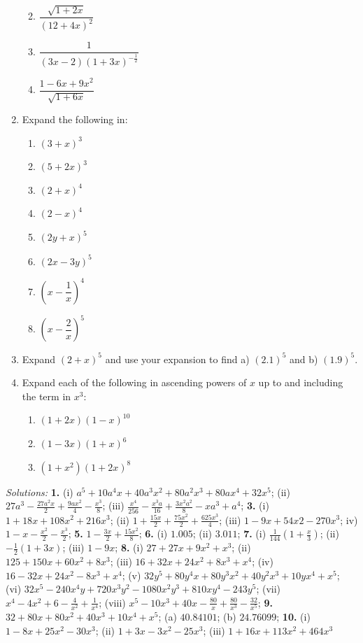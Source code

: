 \documentclass[
  12pt,
  oneside]{book}
\providecommand{\tightlist}{%
  \setlength{\itemsep}{0pt}\setlength{\parskip}{0pt}}
\theoremstyle{definition}
\theoremstyle{definition}
\theoremstyle{definition}
\theoremstyle{definition}
\theoremstyle{remark}
\begin{document}
\begin{enumerate}
  \begin{enumerate}
  \def\labelenumii{\roman{enumii})}
  \tightlist
  \item
    \(\dfrac{\sqrt{1+2x}}{(12+4x)^2}\)
  \item
    \(\dfrac{1}{(3x-2)(1+3x)^{-\frac12}}\)
  \item
    \(\dfrac{1-6x+9x^2}{\sqrt{1+6x}}\)
  \end{enumerate}
\item
  Expand the following in:

  \begin{enumerate}
  \def\labelenumii{\roman{enumii})}
  \tightlist
  \item
    \((3 + x)^3\)
  \item
    \((5 + 2x)^3\)
  \item
    \((2 + x)^4\)
  \item
    \((2 - x)^4\)
  \item
    \((2y + x)^5\)
  \item
    \((2x - 3y)^5\)
  \item
    \(\left(x-\dfrac{1}{x}\right)^4\)
  \item
    \(\left(x-\dfrac{2}{x}\right)^5\)
  \end{enumerate}
\item
  Expand \((2 + x)^5\) and use your expansion to find a) \((2.1)^5\) and b) \((1.9)^5\).
\item
  Expand each of the following in ascending powers of \(x\) up to and including the term in \(x^3\):

  \begin{enumerate}
  \def\labelenumii{\roman{enumii})}
  \tightlist
  \item
    \((1 + 2x)(1 - x)^{10}\)
  \item
    \((1 - 3x)(1 + x)^6\)
  \item
    \((1 + x^2)(1 + 2x)^8\)
  \end{enumerate}
\end{enumerate}

\emph{Solutions:}
\textbf{1.} (i) \(a^5 + 10a^4x + 40a^3x^2 + 80a^2x^3 + 80ax^4 + 32x^5\);
(ii) \(27a^3-\frac{27a^2x}{2}+\frac{9ax^2}{4}-\frac{x^3}{8}\);
(iii) \(\frac{x^4}{256}-\frac{x^3a}{16}+\frac{3x^2a^2}{8}-xa^3+a^4\);
\textbf{3.} (i) \(1 +18x +108x^2 + 216x^3\); (ii) \(1+\frac{15x}{2}+\frac{75x^2}{2}+ \frac{625x^3}{4}\);
(iii) \(1 - 9x + 54x2 - 270x^3\); iv) \(1-x-\frac{x^2}{2}-\frac{x^3}{2}\);
\textbf{5.} \(1-\frac{3x}{2}+\frac{15x^2}{8}\);
\textbf{6.} (i) \(1.005\); (ii) \(3.011\);
\textbf{7.} (i) \(\frac{1}{144}(1+\frac{x}3)\); (ii) \(-\frac12(1+3x)\); (iii) \(1-9x\);
\textbf{8.} (i) \(27 + 27x + 9x^2 + x^3\);
(ii) \(125 + 150x + 60x^2 + 8x^3\);
(iii) \(16 + 32x + 24x^2 + 8x^3 + x^4\);
(iv) \(16 - 32x + 24x^2 - 8x^3 + x^4\);
(v) \(32y^5 + 80y^4x + 80y^3x^2 + 40y^2x^3 + 10yx^4 + x^5\);
(vi) \(32x^5 - 240x^4y + 720x^3y^2 - 1080x^2y^3 +810xy^4 - 243y^5\);
(vii) \(x^4-4x^2+6-\frac{4}{x^2}+\frac{1}{x^4}\);
(viii) \(x^5-10x^3+40x-\frac{80}{x}+\frac{80}{x^3}-\frac{32}{x^5}\);
\textbf{9.} \(32 + 80x + 80x^2 + 40x^3 + 10x^4 + x^5\); (a) \(40.84101\); (b) \(24.76099\);
\textbf{10.} (i) \(1 - 8x + 25x^2 - 30x^3\); (ii) \(1 + 3x - 3x^2 - 25x^3\); (iii) \(1 + 16x + 113x^2 + 464x^3\)
\end{document}
